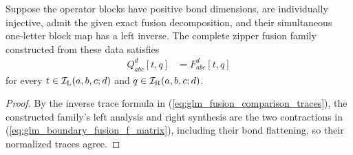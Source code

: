 \begin{lemma}
    \leanok
    \label{thm:glm_source_fusion_comparison}
    Suppose the operator blocks have positive bond dimensions, are
    individually injective, admit the given exact fusion decomposition,
    and their simultaneous one-letter block map has a left inverse.
    The complete zipper fusion family constructed from these data satisfies
    \begin{align}
        Q_{abc}^{d}[t,q] & =F_{abc}^{d}[t,q]
        \label{eq:glm_source_fusion_comparison}
    \end{align}
    for every $t\in\mathcal I_{\rm L}(a,b,c;d)$ and
    $q\in\mathcal I_{\rm R}(a,b,c;d)$.
\end{lemma}
\begin{proof}
    \leanok
    By the inverse trace formula in
    (\ref{eq:glm_fusion_comparison_traces}), the constructed family's
    left analysis and right synthesis are the two contractions
    in (\ref{eq:glm_boundary_fusion_f_matrix}), including their bond
    flattening, so their normalized traces agree.
\end{proof}

